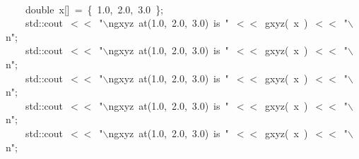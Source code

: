 \documentclass[9pt,onside,a4paper]{article}
\newcommand{\hlstd}[1]{\textcolor[rgb]{0.2,0,0.4}{#1}}
\newcommand{\hlnum}[1]{\textcolor[rgb]{0.2,0.73,0.02}{#1}}
\newcommand{\hlesc}[1]{\textcolor[rgb]{0.65,0.09,0.38}{#1}}
\newcommand{\hlstr}[1]{\textcolor[rgb]{0.09,0.38,0.65}{#1}}
\newcommand{\hlopt}[1]{\textcolor[rgb]{0.33,0.33,0.33}{#1}}
\newcommand{\hlkwb}[1]{\textcolor[rgb]{0.96,0.55,0.14}{#1}}
\newcommand{\hlkwd}[1]{\textcolor[rgb]{0.82,0.11,0.93}{#1}}
\begin{document}
{\hlstd{\hspace*{\fill}\\
}\hlstd{\ \ \ \ }\hlstd{}\hlkwb{double\ }\hlstd{x}\hlopt{{[}{]}\ =\ \{\ }\hlstd{}\hlnum{1.0}\hlstd{}\hlopt{,\ }\hlstd{}\hlnum{2.0}\hlstd{}\hlopt{,\ }\hlstd{}\hlnum{3.0\ }\hlstd{}\hlopt{\};}\hspace*{\fill}\\
\hlstd{}\hlstd{\ \ \ \ }\hlstd{std}\hlopt{::}\hlstd{cout\ }\hlopt{$<$$<$\ }\hlstd{}\hlstr{"}\hlesc{$\backslash$n}\hlstr{gxyz\ at(1.0,\ 2.0,\ 3.0)\ is\ "}\hlstd{\ }\hlopt{$<$$<$\ }\hlstd{}\hlkwd{gxyz}\hlstd{}\hlopt{(\ }\hlstd{x\ }\hlopt{)\ $<$$<$\ }\hlstd{}\hlstr{"}\hlesc{$\backslash$n}\hlstr{"}\hlstd{}\hlopt{;}\hspace*{\fill}\\
\hlstd{}\hlstd{\ \ \ \ }\hlstd{std}\hlopt{::}\hlstd{cout\ }\hlopt{$<$$<$\ }\hlstd{}\hlstr{"}\hlesc{$\backslash$n}\hlstr{gxyz\ at(1.0,\ 2.0,\ 3.0)\ is\ "}\hlstd{\ }\hlopt{$<$$<$\ }\hlstd{}\hlkwd{gxyz}\hlstd{}\hlopt{(\ }\hlstd{x\ }\hlopt{)\ $<$$<$\ }\hlstd{}\hlstr{"}\hlesc{$\backslash$n}\hlstr{"}\hlstd{}\hlopt{;}\hspace*{\fill}\\
\hlstd{}\hlstd{\ \ \ \ }\hlstd{std}\hlopt{::}\hlstd{cout\ }\hlopt{$<$$<$\ }\hlstd{}\hlstr{"}\hlesc{$\backslash$n}\hlstr{gxyz\ at(1.0,\ 2.0,\ 3.0)\ is\ "}\hlstd{\ }\hlopt{$<$$<$\ }\hlstd{}\hlkwd{gxyz}\hlstd{}\hlopt{(\ }\hlstd{x\ }\hlopt{)\ $<$$<$\ }\hlstd{}\hlstr{"}\hlesc{$\backslash$n}\hlstr{"}\hlstd{}\hlopt{;}\hspace*{\fill}\\
\hlstd{}\hlstd{\ \ \ \ }\hlstd{std}\hlopt{::}\hlstd{cout\ }\hlopt{$<$$<$\ }\hlstd{}\hlstr{"}\hlesc{$\backslash$n}\hlstr{gxyz\ at(1.0,\ 2.0,\ 3.0)\ is\ "}\hlstd{\ }\hlopt{$<$$<$\ }\hlstd{}\hlkwd{gxyz}\hlstd{}\hlopt{(\ }\hlstd{x\ }\hlopt{)\ $<$$<$\ }\hlstd{}\hlstr{"}\hlesc{$\backslash$n}\hlstr{"}\hlstd{}\hlopt{;}\hspace*{\fill}\\
\hlstd{}\hlstd{\ \ \ \ }\hlstd{std}\hlopt{::}\hlstd{cout\ }\hlopt{$<$$<$\ }\hlstd{}\hlstr{"}\hlesc{$\backslash$n}\hlstr{gxyz\ at(1.0,\ 2.0,\ 3.0)\ is\ "}\hlstd{\ }\hlopt{$<$$<$\ }\hlstd{}\hlkwd{gxyz}\hlstd{}\hlopt{(\ }\hlstd{x\ }\hlopt{)\ $<$$<$\ }\hlstd{}\hlstr{"}\hlesc{$\backslash$n}\hlstr{"}\hlstd{}\hlopt{;}\hspace*{\fill}\\
}
\end{document}
